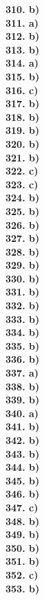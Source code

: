 \documentclass[8pt]{extarticle}
\begin{document}
\begin{multicols}{8}
\textbf{310. b)} \\
\textbf{311. a)} \\
\textbf{312. b)} \\
\textbf{313. b)} \\
\textbf{314. a)} \\
\textbf{315. b)} \\
\textbf{316. c)} \\
\textbf{317. b)} \\
\textbf{318. b)} \\
\textbf{319. b)} \\
\textbf{320. b)} \\
\textbf{321. b)} \\
\textbf{322. c)} \\
\textbf{323. c)} \\
\textbf{324. b)} \\
\textbf{325. b)} \\
\textbf{326. b)} \\
\textbf{327. b)} \\
\textbf{328. b)} \\
\textbf{329. b)} \\
\textbf{330. b)} \\
\textbf{331. b)} \\
\textbf{332. b)} \\
\textbf{333. b)} \\
\textbf{334. b)} \\
\textbf{335. b)} \\
\textbf{336. b)} \\
\textbf{337. a)} \\
\textbf{338. b)} \\
\textbf{339. b)} \\
\textbf{340. a)} \\
\textbf{341. b)} \\
\textbf{342. b)} \\
\textbf{343. b)} \\
\textbf{344. b)} \\
\textbf{345. b)} \\
\textbf{346. b)} \\
\textbf{347. c)} \\
\textbf{348. b)} \\
\textbf{349. b)} \\
\textbf{350. b)} \\
\textbf{351. b)} \\
\textbf{352. c)} \\
\textbf{353. b)} \\

\end{multicols}
\end{document}
